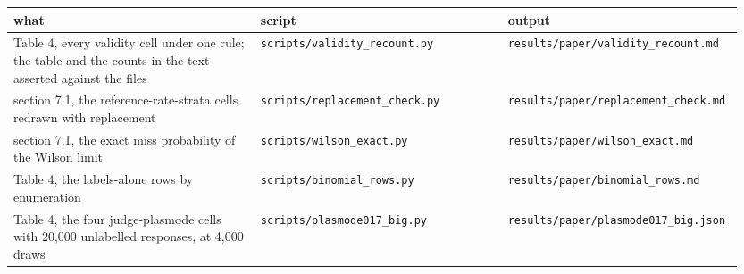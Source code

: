 \documentclass[11pt]{article}
\begin{document}
\begingroup\footnotesize\setlength{\tabcolsep}{4pt}
\begin{longtable}{@{}>{\raggedright\arraybackslash}p{0.334\linewidth}>{\raggedright\arraybackslash}p{0.333\linewidth}>{\raggedright\arraybackslash}p{0.279\linewidth}@{}}
\toprule
\textbf{\hspace{0pt}what} & \textbf{\hspace{0pt}script} & \textbf{\hspace{0pt}output} \\
\midrule
\endhead
\bottomrule
\endlastfoot
\hspace{0pt}Table 4, every validity cell under one rule; the table and the counts in the text asserted against the files & \hspace{0pt}\texttt{scripts/\allowbreak validity\_\allowbreak recount.py} & \hspace{0pt}\texttt{results/\allowbreak paper/\allowbreak validity\_\allowbreak recount.md} \\
\hspace{0pt}section 7.1, the reference-rate-strata cells redrawn with replacement & \hspace{0pt}\texttt{scripts/\allowbreak replacement\_\allowbreak check.py} & \hspace{0pt}\texttt{results/\allowbreak paper/\allowbreak replacement\_\allowbreak check.md} \\
\hspace{0pt}section 7.1, the exact miss probability of the Wilson limit & \hspace{0pt}\texttt{scripts/\allowbreak wilson\_\allowbreak exact.py} & \hspace{0pt}\texttt{results/\allowbreak paper/\allowbreak wilson\_\allowbreak exact.md} \\
\hspace{0pt}Table 4, the labels-alone rows by enumeration & \hspace{0pt}\texttt{scripts/\allowbreak binomial\_\allowbreak rows.py} & \hspace{0pt}\texttt{results/\allowbreak paper/\allowbreak binomial\_\allowbreak rows.md} \\
\hspace{0pt}Table 4, the four judge-plasmode cells with 20,000 unlabelled responses, at 4,000 draws & \hspace{0pt}\texttt{scripts/\allowbreak plasmode017\_\allowbreak big.py} & \hspace{0pt}\texttt{results/\allowbreak paper/\allowbreak plasmode017\_\allowbreak big.json} \\

\end{longtable}
\end{document}
